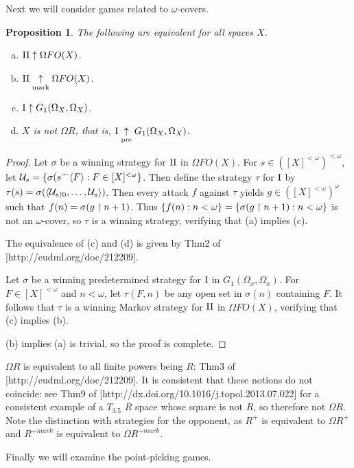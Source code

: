 \documentclass{amsart}
\theoremstyle{plain}
\newtheorem{proposition}[theorem]{Proposition}
\theoremstyle{definition}
\theoremstyle{remark}
\theoremstyle{plain}
\theoremstyle{definition}
\theoremstyle{remark}
\begin{document}
Next we will consider games related to \(\omega\)-covers.

\begin{proposition}
The following are equivalent for all spaces \(X\).
 \begin{enumerate}[a)]
  \item \(\mathrm{II}\uparrow \Omega FO(X)\).
  \item \(\mathrm{II}\underset{\text{mark}}{\uparrow} \Omega FO(X)\).
  \item \(\mathrm{I}\uparrow G_1(\Omega_X,\Omega_X)\).
  \item \(X\) is not \(\Omega R\), that is, \(\mathrm{I}\underset{\text{pre}}{\uparrow} G_1(\Omega_X,\Omega_X)\).
 \end{enumerate}
\end{proposition}
\begin{proof}
 Let \(\sigma\) be a winning strategy for \(\mathrm{II}\) in \(\Omega FO(X)\).
 For \(s\in([X]^{<\omega})^{<\omega}\), let \(\mathcal{U}_s=\{\sigma(s{^\frown}\langle F\rangle:F\in[X]^{<\omega}\}\). 
 Then define the strategy \(\tau\) for \(\mathrm{I}\) by \(\tau(s)=\sigma(\langle\mathcal{U}_{s\restriction 0},\dots,\mathcal{U}_s\rangle)\). 
 Then every attack \(f\) against \(\tau\) yields \(g\in([X]^{<\omega})^\omega\) such that \(f(n)=\sigma(g\restriction n+1)\). 
 Thus \(\{f(n):n<\omega\}=\{\sigma(g\restriction n+1):n<\omega\}\) is not an \(\omega\)-cover, so \(\tau\) is a winning strategy, verifying that (a) implies (c).

 The equivalence of (c) and (d) is given by Thm2 of [http://eudml.org/doc/212209].

 Let \(\sigma\) be a winning predetermined strategy for \(\mathrm{I}\) in \(G_1(\Omega_x,\Omega_x)\). For \(F\in[X]^{<\omega}\) and \(n<\omega\), let \(\tau(F,n)\) be any open set in \(\sigma(n)\) containing \(F\). 
 It follows that \(\tau\) is a winning Markov strategy for \(\mathrm{II}\) in \(\Omega FO(X)\), verifying that (c) implies (b).

 (b) implies (a) is trivial, so the proof is complete.
\end{proof}

\(\Omega R\) is equivalent to all finite powers being \(R\): Thm3 of [http://eudml.org/doc/212209]. 
It is consistent that these notions do not coincide: see Thm9 of [http://dx.doi.org/10.1016/j.topol.2013.07.022] for a consistent example of a \(T_{3.5}\) \(R\) space whose square is not \(R\), so therefore not \(\Omega R\). 
Note the distinction with strategies for the opponent, as \(R^+\) is equivalent to \(\Omega R^+\) and \(R^{+mark}\) is equivalent to \(\Omega R^{+mark}\).

Finally we will examine the point-picking games.
\end{document}
